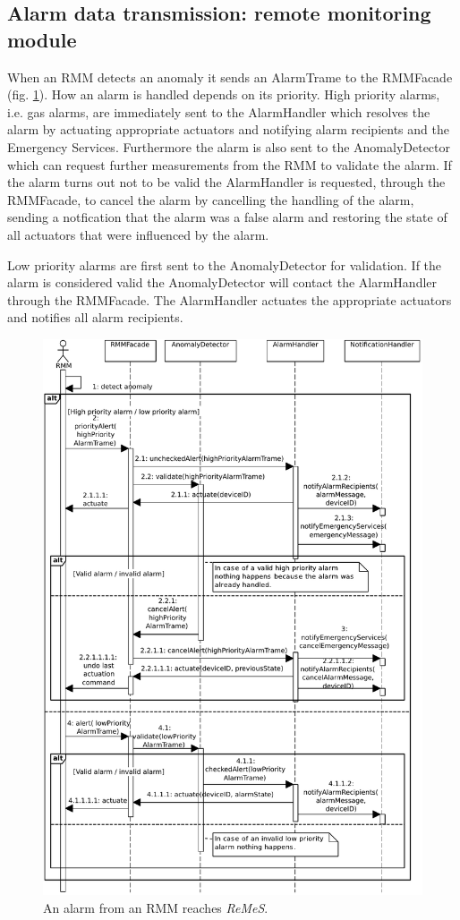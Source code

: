 \documentclass[a4paper,10pt]{article}
\newcommand{\rem}{\emph{ReMeS}\xspace}
\begin{document}
\subsection{Alarm data transmission: remote monitoring module}
When an RMM detects an anomaly it sends an AlarmTrame to the RMMFacade (fig. \ref{fig:seq_alarm}). How an alarm is handled depends on its priority. High priority alarms, i.e. gas alarms, are immediately sent to the AlarmHandler which resolves the alarm by actuating appropriate actuators and notifying alarm recipients and the Emergency Services. Furthermore the alarm is also sent to the AnomalyDetector which can request further measurements from the RMM to validate the alarm. If the alarm turns out not to be valid the AlarmHandler is requested, through the RMMFacade, to cancel the alarm by cancelling the handling of the alarm, sending a notfication that the alarm was a false alarm and restoring the state of all actuators that were influenced by the alarm.

Low priority alarms are first sent to the AnomalyDetector for validation. If the alarm is considered valid the AnomalyDetector will contact the AlarmHandler through the RMMFacade. The AlarmHandler actuates the appropriate actuators and notifies all alarm recipients.

\begin{figure}[!htp]
    \centering
    \includegraphics[width=\textwidth]{RMM_Alarm}
    \caption{An alarm from an RMM reaches \rem.}
    \label{fig:seq_alarm}
\end{figure}
\end{document}
